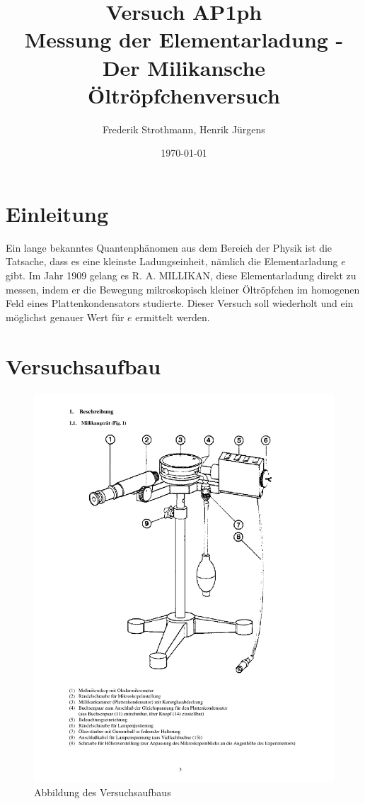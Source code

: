 \documentclass[12pt]{scrartcl}
\title{Versuch AP1ph\\ Messung der Elementarladung - Der Milikansche Öltröpfchenversuch}
\author{Frederik Strothmann, Henrik Jürgens}
\date{\today}
\begin{document}

\maketitle
\tableofcontents
\newpage


\section{Einleitung}

Ein lange bekanntes Quantenphänomen aus dem Bereich der Physik ist die Tatsache, dass es eine kleinste
Ladungseinheit, nämlich die Elementarladung $e$ gibt. Im Jahr 1909 gelang es R. A. MILLIKAN, diese Elementarladung direkt zu messen, indem er die Bewegung mikroskopisch kleiner Öltröpfchen im homogenen Feld eines Plattenkondensators studierte. Dieser Versuch soll wiederholt und ein möglichst genauer Wert für $e$ ermittelt werden.

\section{Versuchsaufbau}

\begin{figure}[H] 
  \centering
    \includegraphics[trim = 10mm 75mm 10mm 10mm, clip, scale = 0.7]{aufbau.pdf}
  	\caption[Abbildung des Versuchsaufbaus]{Abbildung des Versuchsaufbaus\footnotemark}
  \label{fig:abb_versuch_3}
\end{figure}
\end{document}
